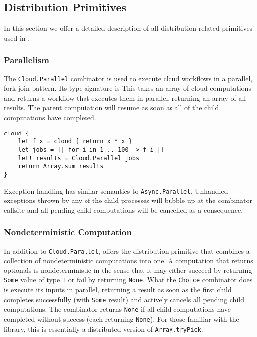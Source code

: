 \subsection{Distribution Primitives}

In this section we offer a detailed description of all distribution related
primitives used in \mbrace{}.

\subsubsection*{Parallelism}

The \texttt{Cloud.Parallel} combinator is used to execute cloud workflows in a parallel, 
fork-join pattern. Its type signature is
This takes an array of cloud computations and returns a workflow that executes them
in parallel, returning an array of all results.
The parent computation will resume as soon as all of the child computations have completed.
\begin{lstlisting}
cloud {
    let f x = cloud { return x * x }
    let jobs = [| for i in 1 .. 100 -> f i |]   
    let! results = Cloud.Parallel jobs
    return Array.sum results
}
\end{lstlisting}
%
Exception handling has similar semantics to \texttt{Async.Parallel}.
Unhandled exceptions thrown by any of the child processes will
bubble up at the combinator callsite and all pending child computations
will be cancelled as a consequence.

\subsubsection*{Nondeterministic Computation}
%
In addition to \texttt{Cloud.Parallel}, \mbrace{} offers the distribution primitive
that combines a collection of nondeterministic computations into one.
A computation that returns optionals is nondeterministic in the sense that
it may either succeed by returning \texttt{Some} value of type \texttt{\uq{}T} or
fail by returning \texttt{None}.
What the \texttt{Choice} combinator does is execute its inputs in parallel,
returning a result as soon as the first child completes successfully 
(with \texttt{Some} result) and actively cancels all pending child computations.
The combinator returns \texttt{None} if all child computations have completed
without success (each returning \texttt{None}).
For those familiar with the \fsharp{} library, this is essentially a distributed
version of \texttt{Array.tryPick}.

